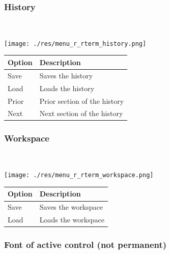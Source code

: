 \hypertarget{menu_r_rterm_history}{}
\subsubsection{History}\\

\texttt{[image: ./res/menu\_r\_rterm\_history.png]}\\

\begin{scriptsize}\begin{tabularx}{\textwidth}{>{\hsize=0.3\hsize}X>{\hsize=0.7\hsize}X}\\
    \hline
    \textbf{Option} & \textbf{Description} \\
    \hline
    Save & Saves the history \\
    Load & Loads the history \\
    Prior & Prior section of the history \\
    Next & Next section of the history \\
    \hline
  \end{tabularx}\end{scriptsize}


\hypertarget{menu_r_rterm_workspace}{}
\subsubsection{Workspace}\\

\texttt{[image: ./res/menu\_r\_rterm\_workspace.png]}\\

\begin{scriptsize}\begin{tabularx}{\textwidth}{>{\hsize=0.3\hsize}X>{\hsize=0.7\hsize}X}\\
    \hline
    \textbf{Option} & \textbf{Description} \\
    \hline
    Save & Saves the workspace \\
    Load & Loads the workspace \\
    \hline
  \end{tabularx}\end{scriptsize}


\hypertarget{menu_r_rterm_fontsize}{}
\subsubsection{Font of active control (not permanent)}\\

